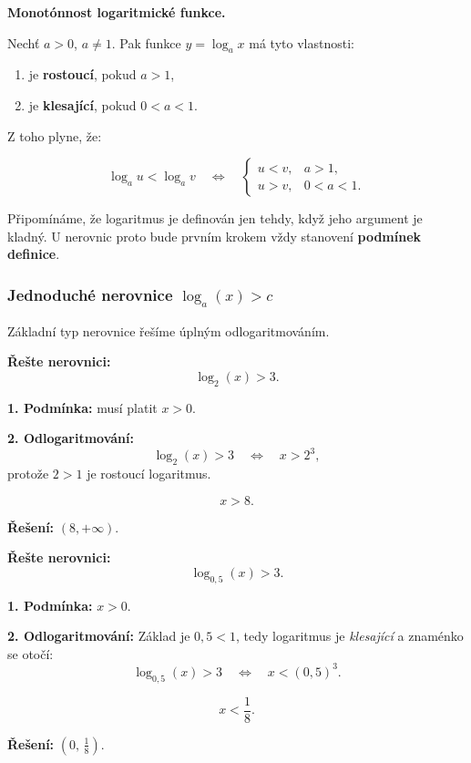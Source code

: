 \documentclass[12pt,a4paper]{article}
\begin{document}
\begin{definitionbox}
\textbf{Monotónnost logaritmické funkce.}

Nechť $a>0$, $a\neq 1$. Pak funkce $y = \log_a x$ má tyto vlastnosti:

\begin{enumerate}[label=\arabic*.]
  \item je \textbf{rostoucí}, pokud $a>1$,
  \item je \textbf{klesající}, pokud $0 < a < 1$.
\end{enumerate}
Z toho plyne, že:

\[
\log_a u < \log_a v \quad\Longleftrightarrow\quad
\begin{cases}
u < v, & a>1, \\
u > v, & 0<a<1.
\end{cases}
\]

\end{definitionbox}

\begin{notebox}
Připomínáme, že logaritmus je definován jen tehdy, když jeho argument je
kladný. U nerovnic proto bude prvním krokem vždy stanovení \textbf{podmínek
definice}.
\end{notebox}

\subsubsection*{Jednoduché nerovnice $\log_a(x) > c$}

Základní typ nerovnice řešíme úplným odlogaritmováním.

\begin{examplebox}
\textbf{Řešte nerovnici:}
\[
\log_2(x) > 3.
\]

\textbf{1. Podmínka:} musí platit $x>0$.

\textbf{2. Odlogaritmování:}
\[
\log_2(x) > 3 \quad\Longleftrightarrow\quad x > 2^3,
\]
protože $2>1$ je rostoucí logaritmus.

\[
x > 8.
\]

\textbf{Řešení: } $(8, +\infty)$.
\end{examplebox}

\begin{examplebox}
\textbf{Řešte nerovnici:}
\[
\log_{0{,}5}(x) > 3.
\]

\textbf{1. Podmínka:} $x > 0$.

\textbf{2. Odlogaritmování:} Základ je $0{,}5 < 1$, tedy logaritmus je
\emph{klesající} a znaménko se otočí:
\[
\log_{0{,}5}(x) > 3
\quad\Longleftrightarrow\quad
x < (0{,}5)^3.
\]

\[
x < \frac{1}{8}.
\]

\textbf{Řešení: } $(0,\, \tfrac18)$.
\end{examplebox}
\end{document}
